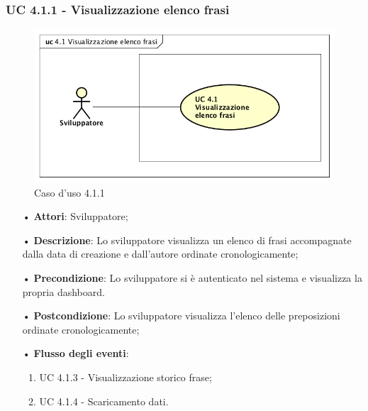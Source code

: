 \subsubsection{UC 4.1.1 - Visualizzazione elenco frasi}
\begin{figure}[H]
\centering
\includegraphics[width=17cm]{img/UC410.png} 
\caption{Caso d'uso 4.1.1}\label{fig:411}
\end{figure}
\begin{itemize}
\item[•]\textbf{Attori}: Sviluppatore;
\item[•]\textbf{Descrizione}: Lo sviluppatore visualizza un elenco di frasi accompagnate dalla data di creazione e dall’autore ordinate cronologicamente;
\item[•]\textbf{Precondizione}:  Lo sviluppatore si è autenticato nel sistema e visualizza la propria dashboard.
\item[•]\textbf{Postcondizione}: Lo sviluppatore visualizza l'elenco delle preposizioni ordinate cronologicamente;
\item[•]\textbf{Flusso degli eventi}: 
\begin{enumerate}
\item UC 4.1.3 - Visualizzazione storico frase;
\item UC 4.1.4 - Scaricamento dati.
\end{enumerate}
\end{itemize}

